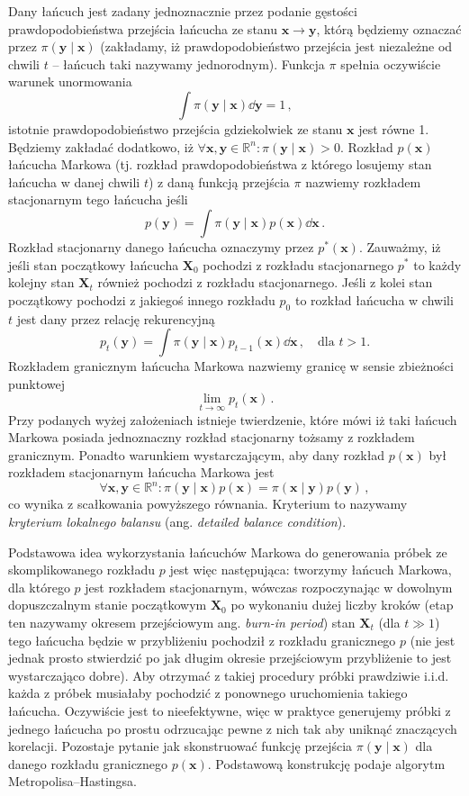\documentclass{myclass}
\begin{document}
Dany łańcuch jest zadany jednoznacznie przez podanie gęstości prawdopodobieństwa przejścia łańcucha
ze stanu \(\bm{x} \to \bm{y}\), którą będziemy oznaczać przez \(\pi(\bm{y} \mid \bm{x})\)
(zakładamy, iż prawdopodobieństwo przejścia jest niezależne od chwili \(t\) -- łańcuch taki nazywamy
jednorodnym). Funkcja \(\pi\) spełnia oczywiście warunek unormowania
\[
\int \pi(\bm{y} \mid \bm{x}) \dd{\bm{y}} = 1\,,
\]
istotnie prawdopodobieństwo przejścia gdziekolwiek ze stanu \(\bm{x}\) jest równe 1. Będziemy
zakładać dodatkowo, iż \(\forall \bm{x},\bm{y}\in\mathbb{R}^n: \pi(\bm{y} \mid \bm{x}) > 0\).
Rozkład \(p(\bm{x})\) łańcucha Markowa (tj. rozkład prawdopodobieństwa z którego losujemy stan
łańcucha w danej chwili \(t\)) z daną funkcją przejścia \(\pi\) nazwiemy rozkładem stacjonarnym tego
łańcucha jeśli
\[
p(\bm{y}) = \int \pi(\bm{y} \mid \bm{x})p(\bm{x}) \dd{\bm{x}}\,.
\]
Rozkład stacjonarny danego łańcucha oznaczymy przez \(p^*(\bm{x})\). Zauważmy, iż jeśli stan
początkowy łańcucha \(\bm{X}_0\) pochodzi z rozkładu stacjonarnego \(p^*\) to każdy kolejny stan
\(\bm{X}_t\) również pochodzi z rozkładu stacjonarnego. Jeśli z kolei stan początkowy pochodzi z
jakiegoś innego rozkładu \(p_0\) to rozkład łańcucha w chwili \(t\) jest dany przez relację
rekurencyjną
\[
p_t(\bm{y}) = \int \pi(\bm{y} \mid \bm{x})p_{t-1}(\bm{x}) \dd{\bm{x}}\,,\quad\text{dla \(t > 1\).}
\]
Rozkładem granicznym łańcucha Markowa nazwiemy granicę w sensie zbieżności punktowej
\[
\lim_{t\to\infty} p_t(\bm{x})\,.
\]
Przy podanych wyżej założeniach istnieje twierdzenie, które mówi iż taki łańcuch Markowa posiada
jednoznaczny rozkład stacjonarny tożsamy z rozkładem granicznym. Ponadto warunkiem wystarczającym,
aby dany rozkład \(p(\bm{x})\) był rozkładem stacjonarnym łańcucha Markowa jest
\[
\forall\bm{x}, \bm{y} \in \mathbb{R}^n: \pi(\bm{y}\mid\bm{x}) p(\bm{x}) = \pi(\bm{x} \mid \bm{y}) p(\bm{y})\,,
\]
co wynika z scałkowania powyższego równania. Kryterium to nazywamy \emph{kryterium lokalnego
balansu} (ang. \emph{detailed balance condition}).

Podstawowa idea wykorzystania łańcuchów Markowa do generowania próbek ze skomplikowanego rozkładu
\(p\) jest więc następująca: tworzymy łańcuch Markowa, dla którego \(p\) jest rozkładem
stacjonarnym, wówczas rozpoczynając w dowolnym dopuszczalnym stanie początkowym \(\bm{X}_0\) po
wykonaniu dużej liczby kroków (etap ten nazywamy okresem przejściowym ang. \emph{burn-in period})
stan \(\bm{X}_t\) (dla \(t \gg 1\)) tego łańcucha będzie w przybliżeniu pochodził z rozkładu
granicznego \(p\) (nie jest jednak prosto stwierdzić po jak długim okresie przejściowym przybliżenie
to jest wystarczająco dobre). Aby otrzymać z takiej procedury próbki prawdziwie i.i.d. każda z
próbek musiałaby pochodzić z ponownego uruchomienia takiego łańcucha. Oczywiście jest to
nieefektywne, więc w praktyce generujemy próbki z jednego łańcucha po prostu odrzucając pewne z nich
tak aby uniknąć znaczących korelacji. Pozostaje pytanie jak skonstruować funkcję przejścia
\(\pi(\bm{y} \mid \bm{x})\) dla danego rozkładu granicznego \(p(\bm{x})\). Podstawową konstrukcję
podaje algorytm Metropolisa--Hastingsa. 
\end{document}
